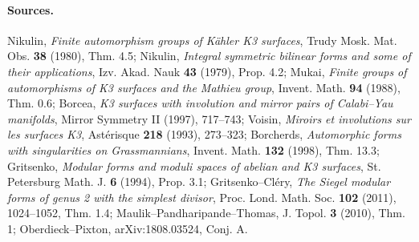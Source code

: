\paragraph{Sources.}
Nikulin, \emph{Finite automorphism groups of K\"ahler K3 surfaces},
Trudy Mosk. Mat. Obs. \textbf{38} (1980), Thm. 4.5;
Nikulin, \emph{Integral symmetric bilinear forms and some of their
applications}, Izv. Akad. Nauk \textbf{43} (1979), Prop. 4.2;
Mukai, \emph{Finite groups of automorphisms of K3 surfaces and the
Mathieu group}, Invent. Math. \textbf{94} (1988), Thm. 0.6;
Borcea, \emph{K3 surfaces with involution and mirror pairs of
Calabi--Yau manifolds}, Mirror Symmetry II (1997), 717--743;
Voisin, \emph{Miroirs et involutions sur les surfaces K3},
Ast\'erisque \textbf{218} (1993), 273--323;
Borcherds, \emph{Automorphic forms with singularities on Grassmannians},
Invent. Math. \textbf{132} (1998), Thm. 13.3;
Gritsenko, \emph{Modular forms and moduli spaces of abelian and K3
surfaces}, St. Petersburg Math. J. \textbf{6} (1994), Prop. 3.1;
Gritsenko--Cl\'ery, \emph{The Siegel modular forms of genus 2 with the
simplest divisor}, Proc. Lond. Math. Soc. \textbf{102} (2011),
1024--1052, Thm. 1.4;
Maulik--Pandharipande--Thomas, J. Topol. \textbf{3} (2010), Thm. 1;
Oberdieck--Pixton, arXiv:1808.03524, Conj. A.
